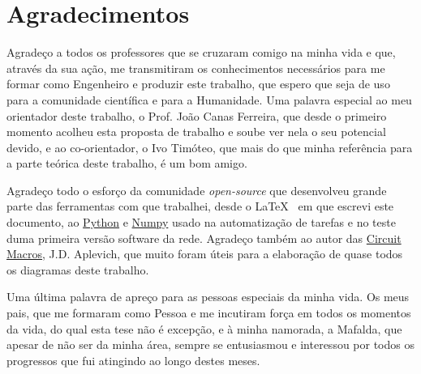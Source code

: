 \chapter*{Agradecimentos}

Agradeço a todos os professores que se cruzaram comigo na minha vida e que, através da sua ação,
me transmitiram os conhecimentos necessários para me formar como Engenheiro e produzir este trabalho,
que espero que seja de uso para a comunidade científica e para a Humanidade. Uma palavra especial
ao meu orientador deste trabalho, o Prof. João Canas Ferreira, que desde o primeiro momento acolheu
esta proposta de trabalho e soube ver nela o seu potencial devido, e ao co-orientador, o Ivo Timóteo,
que mais do que minha referência para a parte teórica deste trabalho, é um bom amigo.

Agradeço todo o esforço da comunidade \textit{open-source} que desenvolveu grande parte das ferramentas
com que trabalhei, desde o \LaTeX~ em que escrevi este documento, ao \href{https://www.python.org/}{Python} e \href{http://www.numpy.org/}{Numpy}
usado na automatização de tarefas e no teste duma primeira versão software da rede. Agradeço também ao autor das \href{https://ece.uwaterloo.ca/~aplevich/Circuit_macros/}{Circuit Macros},
J.D. Aplevich, que muito foram úteis para a elaboração de quase todos os diagramas deste trabalho.

Uma última palavra de apreço para as pessoas especiais da minha vida. Os meus pais, que me formaram como Pessoa e me
incutiram força em todos os momentos da vida, do qual esta tese não é excepção, e à minha namorada, a Mafalda, que apesar
de não ser da minha área, sempre se entusiasmou e interessou por todos os progressos que fui atingindo ao longo destes meses.

\vspace{10mm}
